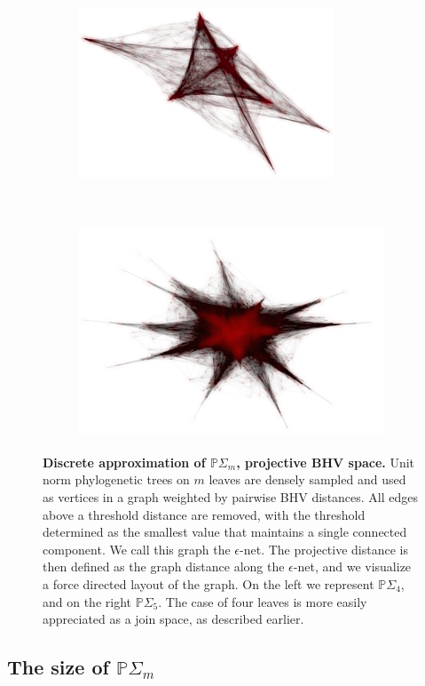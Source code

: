 \documentclass[a4paper,11pt]{article}
\begin{document}
\begin{figure}
    \begin{subfigure}{0.5\linewidth}
    \centering
    \includegraphics[height=2in]{../figures/epsilon_net_quad.png}
    \end{subfigure}
    ~
    \begin{subfigure}{0.5\linewidth}
    \centering
    \includegraphics[height=2.5in]{../figures/epsilon_net_quint.png}
    \end{subfigure}

    \caption{{\bf Discrete approximation of $\mathbb{P}\Sigma_m$, projective BHV space.} Unit norm phylogenetic trees on $m$ leaves are densely sampled and used as vertices in a graph weighted by pairwise BHV distances. All edges above a threshold distance are removed, with the threshold determined as the smallest value that maintains a single connected component. We call this graph the  $\epsilon$-net. The projective distance is then defined as the graph distance along the $\epsilon$-net, and we visualize a force directed layout of the graph. On the left we represent $\mathbb{P}\Sigma_4$, and on the right $\mathbb{P}\Sigma_5$. The case of four leaves is more easily appreciated as a join space, as described earlier.}
     \label{fig:epsilon_net}
\end{figure}

\subsection{The size of $\mathbb{P}\Sigma_m$}\label{sec:inj}
\end{document}
